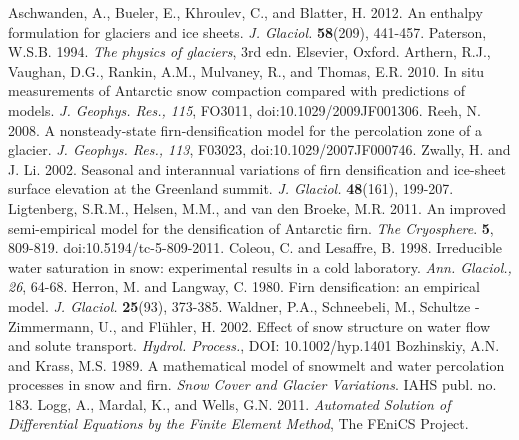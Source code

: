 \documentclass{article}%
\begin{document}
\newpage
\begin{thebibliography}{1}

  Aschwanden, A., Bueler, E., Khroulev, C., and Blatter, H. 2012. An enthalpy formulation for glaciers and ice sheets. \textit{J. Glaciol.} \textbf{58}(209), 441\mbox{-}457.
  Paterson, W.S.B. 1994. \textit{The physics of glaciers}, 3rd edn. Elsevier, Oxford.
  Arthern, R.J., Vaughan, D.G., Rankin, A.M., Mulvaney, R., and Thomas, E.R. 2010. In situ measurements of Antarctic snow compaction compared with predictions of models. \textit{J. Geophys. Res., 115}, FO3011, doi:10.1029/2009JF001306.
  Reeh, N. 2008. A nonsteady\mbox{-}state firn\mbox{-}densification model for the percolation zone of a glacier. \textit{J. Geophys. Res., 113}, F03023, doi:10.1029/2007JF000746.
  Zwally, H. and J. Li. 2002. Seasonal and interannual variations of firn densification and ice\mbox{-}sheet surface elevation at the Greenland summit. \textit{J. Glaciol.} \textbf{48}(161), 199\mbox{-}207.
  Ligtenberg, S.R.M., Helsen, M.M., and van den Broeke, M.R. 2011. An improved semi\mbox{-}empirical model for the densification of Antarctic firn. \textit{The Cryosphere}. \textbf{5}, 809\mbox{-}819. doi:10.5194/tc\mbox{-}5\mbox{-}809\mbox{-}2011.
  \bibitem{}Coleou, C. and Lesaffre, B. 1998. Irreducible water saturation in snow: experimental results in a cold laboratory. \textit{Ann. Glaciol., 26}, 64\mbox{-}68.
  Herron, M. and Langway, C. 1980. Firn densification: an empirical model. \textit{J. Glaciol.} \textbf{25}(93), 373\mbox{-}385.
  Waldner, P.A., Schneebeli, M., Schultze \mbox{-} Zimmermann, U., and Fl\"{u}hler, H. 2002. Effect of snow structure on water flow and solute transport. \textit{Hydrol. Process.}, DOI: 10.1002/hyp.1401
  Bozhinskiy, A.N. and Krass, M.S. 1989. A mathematical model of snowmelt and water percolation processes in snow and firn. \textit{Snow Cover and Glacier Variations}. IAHS publ. no. 183.
  Logg, A., Mardal, K., and Wells, G.N. 2011. \textit{Automated Solution of Differential Equations by the Finite Element Method}, The FEniCS Project.
\end{thebibliography}
\end{document}
